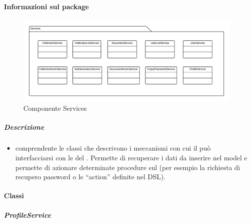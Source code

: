   \paragraph{Informazioni sul package}
    \begin{figure}[H] 
      \begin{center}
        \includegraphics[width=\textwidth]{uml/package/Front-end::Services.png}
        \caption{Componente Services}
      \end{center}  
    \end{figure} 
  \subparagraph{Descrizione} 
    \begin{itemize}
    \item[]  comprendente le classi che descrivono i meccanismi con cui il  può interfacciarsi con le  del . Permette di recuperare i dati da inserire nel model e permette di azionare determinate procedure sul  (per esempio la richiesta di recupero password o le ``action'' definite nel DSL).
    \end{itemize} 
    \paragraph{Classi}
      \subparagraph{ProfileService}
        
